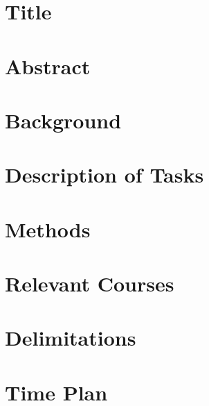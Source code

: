 \documentclass{article}
\begin{document}
\newpage

\setcounter{page}{2}

\newpage

\section{Title}
\section{Abstract}
\section{Background}
\section{Description of Tasks}
\section{Methods}
\section{Relevant Courses}
\section{Delimitations}
\section{Time Plan}
\end{document}
